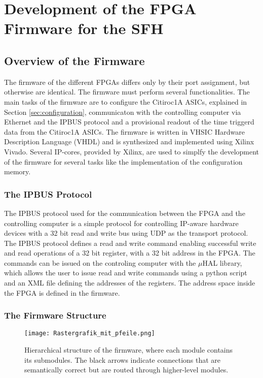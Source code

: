 \chapter{Development of the FPGA Firmware for the SFH}\label{cha:development}
\noindent
\section{Overview of the Firmware}
The firmware of the different FPGAs differs only by their port assignment, but otherwise are identical.
\newline
The firmware must perform several functionalities.
\newline
The main tasks of the firmware are to configure the Citiroc1A ASICs, explained in Section \ref{sec:configuration},
 communicaton with the controlling computer via Ethernet and the IPBUS protocol and a provisional readout of the time triggerd data from the Citiroc1A ASICs.
\newline
The firmware is written in VHSIC Hardware Description Language (VHDL) and is synthesized and implemented using Xilinx Vivado.
Several IP-cores, provided by Xilinx, are used to simplfy the development of the firmware for several tasks like the implementation of the configuration memory.
\subsection{The IPBUS Protocol}
The IPBUS protocol used for the communication between the FPGA and the controlling computer is a simple protocol for controlling IP-aware hardware devices with a 32 bit read and write bus using UDP as the transport protocol.\autocite{IPBUS_article}
\newline
The IPBUS protocol defines a read and write command enabling successful write and read operations of a 32 bit register, with a 32 bit address in the FPGA.    
\newline
The commands can be issued on the controling computer with the $\mu$HAL library, which allows the user to issue read and write commands using a python script and an XML file defining the addresses of the registers.\autocite{IPBUS_article}
\newline
The address space inside the FPGA is defined in the firmware. 
\subsection{The Firmware Structure}

\begin{figure}[H]
    \centering
    \texttt{[image: Rastergrafik\_mit\_pfeile.png]}%
    \caption{Hierarchical structure of the firmware, where each module contains its submodules.
    The black arrows indicate connections that are semantically correct but are routed through higher-level modules.}
    \label{fig:Firmware_structure}
\end{figure}

